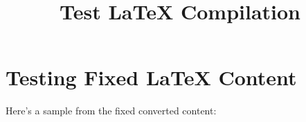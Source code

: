 \documentclass{article}
\begin{document}
\title{Test LaTeX Compilation}
\maketitle

\section{Testing Fixed LaTeX Content}

Here's a sample from the fixed converted content:


\end{document}
